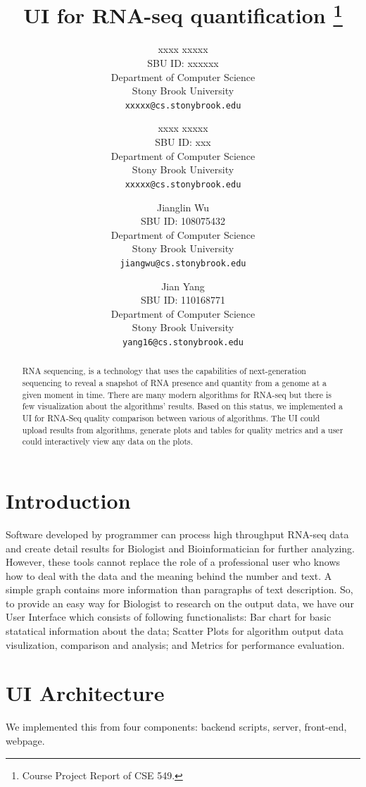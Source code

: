 \documentclass[11pt,letter]{article}
\title{UI for RNA-seq quantification \footnote{Course Project Report of CSE 549.}}
\author{
xxxx xxxxx\\
       {\small SBU ID: xxxxxx}\\
       {\small Department of Computer Science}\\
       {\small Stony Brook University} \\
       {\small \texttt{xxxxx@cs.stonybrook.edu}}
\and
xxxx xxxxx \\
       {\small SBU ID: xxx}\\
       {\small Department of Computer Science}\\
       {\small Stony Brook University} \\
       {\small \texttt{xxxxx@cs.stonybrook.edu}}
\and
Jianglin Wu \\
       {\small SBU ID: 108075432}\\
       {\small Department of Computer Science}\\
       {\small Stony Brook University} \\
       {\small \texttt{jiangwu@cs.stonybrook.edu}}
\and
Jian Yang \\
       {\small SBU ID: 110168771}\\
       {\small Department of Computer Science}\\
       {\small Stony Brook University}\\
       {\small \texttt{yang16@cs.stonybrook.edu}}
}
\date{}
\begin{document}
\maketitle

\begin{abstract}
RNA sequencing, is a technology that uses the capabilities of next-generation sequencing to reveal a snapshot of RNA presence and quantity from a genome at a given moment in time. There are many modern algorithms for RNA-seq but there is few visualization about the algorithms' results. Based on this status, we implemented a UI for RNA-Seq quality comparison between various of algorithms. The UI could upload results from algorithms, generate plots and tables for quality metrics and a user could interactively view any data on the plots.
\end{abstract}

\thispagestyle{empty}
\addtocounter{page}{0}

\section {Introduction}

Software developed by programmer can process high throughput RNA-seq data and create detail results for Biologist and Bioinformatician for further analyzing. However, these tools cannot replace the role of a professional user who knows how to deal with the data and the meaning behind the number and text.  A simple graph contains more information than paragraphs of text description.  So, to provide an easy way for Biologist to research on the output data, we have our User Interface which consists of following functionalists: Bar chart for basic statatical information about the data; Scatter Plots for algorithm output data visulization, comparison and analysis; and Metrics for performance evaluation.   \\


\section {UI Architecture}
We implemented this from four components: backend scripts, server, front-end, webpage. \\
\end{document}
